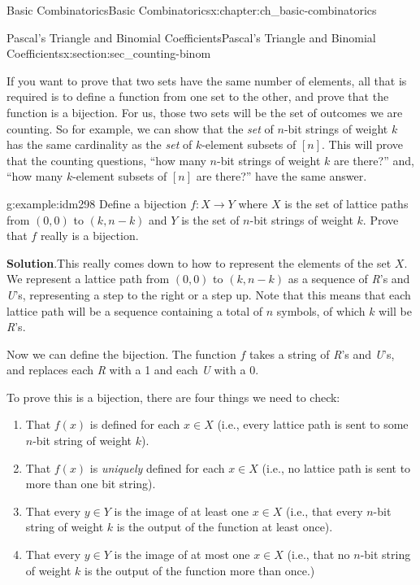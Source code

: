 \documentclass[oneside,10pt,]{book}
\numberwithin{equation}{chapter}
\begin{document}
\begin{chapterptx}{Basic Combinatorics}{}{Basic Combinatorics}{}{}{x:chapter:ch_basic-combinatorics}
\begin{sectionptx}{Pascal's Triangle and Binomial Coefficients}{}{Pascal's Triangle and Binomial Coefficients}{}{}{x:section:sec_counting-binom}
\par
If you want to prove that two sets have the same number of elements, all that is required is to define a function from one set to the other, and prove that the function is a bijection.  For us, those two sets will be the set of outcomes we are counting.  So for example, we can show that the \emph{set} of \(n\)-bit strings of weight \(k\) has the same cardinality as the \emph{set} of \(k\)-element subsets of \([n]\).  This will prove that the counting questions, ``how many \(n\)-bit strings of weight \(k\) are there?'' and, ``how many \(k\)-element subsets of \([n]\) are there?'' have the same answer.%
\par
%
\begin{example}{}{g:example:idm298}%
Define a bijection \(f:X \to Y\) where \(X\) is the set of lattice paths from \((0,0)\) to \((k,n-k)\) and \(Y\) is the set of \(n\)-bit strings of weight \(k\). Prove that \(f\) really is a bijection.%
\par\smallskip%
\noindent\textbf{Solution}.\hypertarget{g:solution:idm309}{}\quad{}This really comes down to how to represent the elements of the set \(X\). We represent a lattice path from \((0,0)\) to \((k, n-k)\) as a sequence of \emph{R}'s and \emph{U}'s, representing a step to the right or a step up.  Note that this means that each lattice path will be a sequence containing a total of \(n\) symbols, of which \(k\) will be \emph{R}'s.%
\par
Now we can define the bijection.  The function \(f\) takes a string of \emph{R}'s and \emph{U}'s, and replaces each \emph{R} with a 1 and each \emph{U} with a 0.%
\par
To prove this is a bijection, there are four things we need to check:%
\begin{enumerate}
\item{}That \(f(x)\) is defined for each \(x \in X\) (i.e., every lattice path is sent to some \(n\)-bit string of weight \(k\)).%
\item{}That \(f(x)\) is \emph{uniquely} defined for each \(x \in X\) (i.e., no lattice path is sent to more than one bit string).%
\item{}That every \(y \in Y\) is the image of at least one \(x \in X\) (i.e., that every \(n\)-bit string of weight \(k\) is the output of the function at least once).%
\item{}That every \(y \in Y\) is the image of at most one \(x \in X\) (i.e., that no \(n\)-bit string of weight \(k\) is the output of the function more than once.)%

\end{enumerate}
\end{example}
\end{sectionptx}
\end{chapterptx}
\end{document}
